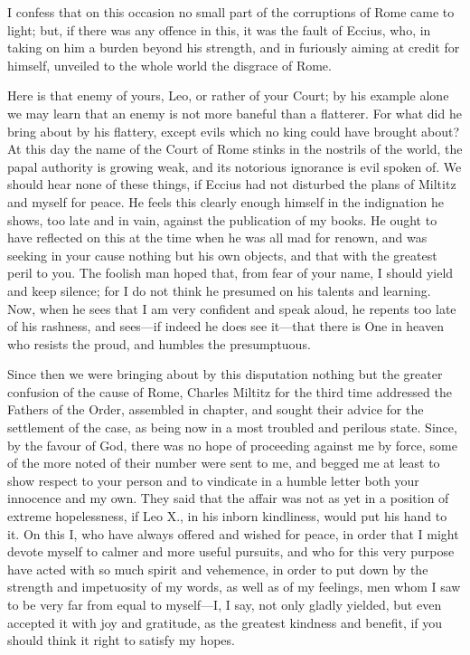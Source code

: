 I confess that on this occasion no small part of the corruptions of Rome
came to light; but, if there was any offence in this, it was the fault of
Eccius, who, in taking on him a burden beyond his strength, and in
furiously aiming at credit for himself, unveiled to the whole world the
disgrace of Rome.

Here is that enemy of yours, Leo, or rather of your Court; by his example
alone we may learn that an enemy is not more baneful than a flatterer. For
what did he bring about by his flattery, except evils which no king could
have brought about? At this day the name of the Court of Rome stinks in
the nostrils of the world, the papal authority is growing weak, and its
notorious ignorance is evil spoken of. We should hear none of these
things, if Eccius had not disturbed the plans of Miltitz and myself for
peace. He feels this clearly enough himself in the indignation he shows,
too late and in vain, against the publication of my books. He ought to
have reflected on this at the time when he was all mad for renown, and was
seeking in your cause nothing but his own objects, and that with the
greatest peril to you. The foolish man hoped that, from fear of your name,
I should yield and keep silence; for I do not think he presumed on his
talents and learning. Now, when he sees that I am very confident and speak
aloud, he repents too late of his rashness, and sees—if indeed he
does see it—that there is One in heaven who resists the proud, and
humbles the presumptuous.

Since then we were bringing about by this disputation nothing but the
greater confusion of the cause of Rome, Charles Miltitz for the third time
addressed the Fathers of the Order, assembled in chapter, and sought their
advice for the settlement of the case, as being now in a most troubled and
perilous state. Since, by the favour of God, there was no hope of
proceeding against me by force, some of the more noted of their number
were sent to me, and begged me at least to show respect to your person and
to vindicate in a humble letter both your innocence and my own. They said
that the affair was not as yet in a position of extreme hopelessness, if
Leo X., in his inborn kindliness, would put his hand to it. On this I, who
have always offered and wished for peace, in order that I might devote
myself to calmer and more useful pursuits, and who for this very purpose
have acted with so much spirit and vehemence, in order to put down by the
strength and impetuosity of my words, as well as of my feelings, men whom
I saw to be very far from equal to myself—I, I say, not only gladly
yielded, but even accepted it with joy and gratitude, as the greatest
kindness and benefit, if you should think it right to satisfy my hopes.

